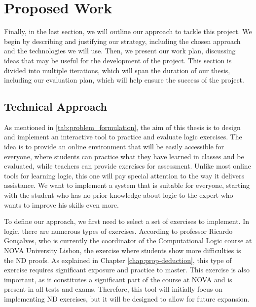 %

\chapter{Proposed Work}

Finally, in the last section, we will outline our approach to tackle this project. We begin by describing and justifying our strategy, including the chosen approach and the technologies we will use. Then, we present our work plan, discussing ideas that may be useful for the development of the project. This section is divided into multiple iterations, which will span the duration of our thesis, including our evaluation plan, which will help ensure the success of the project.

\section{Technical Approach}
As mentioned in \ref{tab:problem_formulation}, the aim of this thesis is to design and implement an interactive tool to practice and evaluate logic exercises. The idea is to provide an online environment that will be easily accessible for everyone, where students can practice what they have learned in classes and be evaluated, while teachers can provide exercises for assessment. Unlike most online tools for learning logic, this one will pay special attention to the way it delivers assistance. We want to implement a system that is suitable for everyone, starting with the student who has no prior knowledge about logic to the expert who wants to improve his skills even more. 

To define our approach, we first need to select a set of exercises to implement. In logic, there are numerous types of exercises. According to professor Ricardo Gonçalves, who is currently the coordinator of the Computational Logic course at NOVA University Lisbon, the exercise where students show more difficulties is the \gls{ND} proofs. As explained in Chapter \ref{chap:prop-deduction}, this type of exercise requires significant exposure and practice to master. This exercise is also important, as it constitutes a significant part of the course at NOVA and is present in all tests and exams. Therefore, this tool will initially focus on implementing \gls{ND} exercises, but it will be designed to allow for future expansion. 


